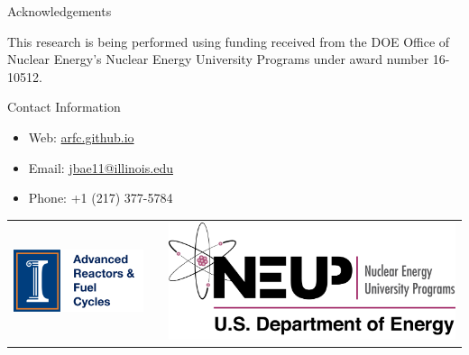 \documentclass[final]{beamer}
\newlength{\onecolwid}
\begin{document}
\begin{frame}[t]
\begin{columns}[t]
\begin{column}{\onecolwid}

\begin{block}{Acknowledgements}

This research is being performed using funding received
from the DOE Office of Nuclear Energy's Nuclear Energy
University Programs under award number 16-10512.

\end{block}




\begin{alertblock}{Contact Information}

\begin{itemize}
	
	\item Web: \href{arfc.github.io}{arfc.github.io}
	\item Email: \href{mailto:jbae11@illinois.edu}{jbae11@illinois.edu}
	\item Phone: +1 (217) 377-5784
\end{itemize}

\end{alertblock}

\begin{center}
\begin{tabular}{ccc}
\includegraphics[width=0.4\linewidth]{logo.png} & \hfill & \includegraphics[width=0.4\linewidth]{neup.png}
\end{tabular}
\end{center}


\end{column} %

\end{columns} %

\end{frame} %
\end{document}
